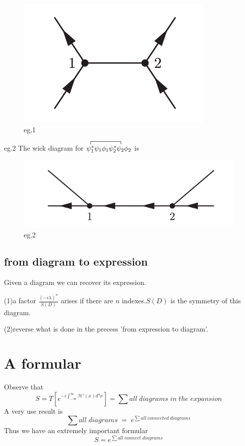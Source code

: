 \documentclass[a4paper]{article}
\begin{document}
\begin{figure}[htbp]
	\centering
	\includegraphics{1.png}
	\caption{eg.1}
	\label{fig:label}
\end{figure}
\par eg.2 The wick diagram for $\contraction{}{\psi^*_1}{\psi_1\phi_1\psi_2^*}{\psi_2}\psi_1^*\psi_1\phi_1\psi_2^*\psi_2\phi_2$ is
\begin{figure}[htbp]
	\centering
	\includegraphics{2.png}
	\caption{eg.2}
	\label{fig:label}
\end{figure}
\subsection{from diagram to expression}
Given a diagram we can recover its expression.
\par (1)a factor $\frac{(-i\lambda)^n}{S(D)}$ arises if there are $n$ indexes.$S(D)$ is the symmetry of this diagram.
\par (2)reverse what is done in the precess 'from expression to diagram'.
\section{A formular}
Observe that$$S=T[e^{-i\int_{-\infty}^{\infty}\mathscr{H}'(x)d^4x}]=\sum all\;diagrams\;in\;the\;expansion$$
A very use result is$$\sum all\;diagrams\;=\;e^{\sum all\;connected\;diagrams}$$Thus we have an extremely important formular$$S = e^{\sum all\;connect\;diagrams}$$
\end{document}
